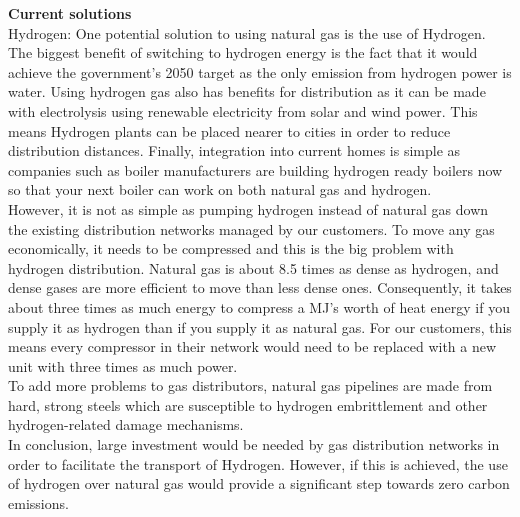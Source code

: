 \documentclass[11pt]{article}		%
\begin{document}
        \textbf{Current solutions}\\
        Hydrogen: One potential solution to using natural gas is the use of Hydrogen. The biggest benefit of switching to hydrogen energy is the fact that it would achieve the government's 2050 target as the only emission from hydrogen power is water. Using hydrogen gas also has benefits for distribution as it can be made with electrolysis using renewable electricity from solar and wind power. This means Hydrogen plants can be placed nearer to cities in order to reduce distribution distances. Finally, integration into current homes is simple as companies such as boiler manufacturers are building hydrogen ready boilers now so that your next boiler can work on both natural gas and hydrogen.\\
        \hspace*{3ex}However, it is not as simple as pumping hydrogen instead of natural gas down the existing distribution networks managed by our customers. To move any gas economically, it needs to be compressed and this is the big problem with hydrogen distribution. Natural gas is about 8.5 times as dense as hydrogen, and dense gases are more efficient to move than less dense ones. Consequently, it takes about three times as much energy to compress a MJ’s worth of heat energy if you supply it as hydrogen than if you supply it as natural gas. For our customers, this means every compressor in their network would need to be replaced with a new unit with three times as much power.\\
        \hspace*{3ex}To add more problems to gas distributors, natural gas pipelines are made from hard, strong steels which are susceptible to hydrogen embrittlement and other hydrogen-related damage mechanisms.\\
        \hspace*{3ex}In conclusion, large investment would be needed by gas distribution networks in order to facilitate the transport of Hydrogen. However, if this is achieved, the use of hydrogen over natural gas would provide a significant step towards zero carbon emissions.\\ 
        
\end{document}
